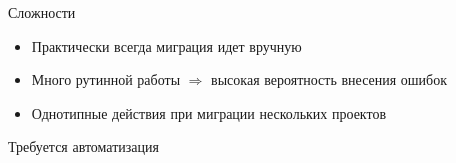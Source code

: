\documentclass[12pt]{beamer}
\begin{document}
{
\begin{frame}{Сложности}
\begin{mybox}[]
\begin{itemize}
	\item Практически всегда миграция идет вручную
	\item Много рутинной работы $\Longrightarrow$ высокая вероятность внесения ошибок
	\item Однотипные действия при миграции нескольких проектов
\end{itemize}
\end{mybox}
\vspace{0.5cm}
\begin{mybox}[]
\begin{center}
    Требуется автоматизация
\end{center}
\end{mybox}
\end{frame}
}
\end{document}
